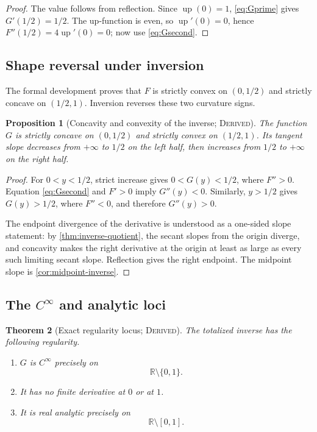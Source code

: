 \documentclass[11pt,oneside]{article}
\newtheorem{theorem}{Theorem}[section]
\newtheorem{proposition}[theorem]{Proposition}
\theoremstyle{definition}
\theoremstyle{remark}
\newcommand{\R}{\mathbb R}
\newcommand{\Up}{\operatorname{up}}
\newcommand{\InvF}{G}
\newcommand{\Derived}{\textsc{Derived}}
\begin{document}
\begin{proof}
The value follows from reflection.  Since $\Up(0)=1$,
\eqref{eq:Gprime} gives $\InvF'(1/2)=1/2$.  The up-function is even, so
$\Up'(0)=0$, hence $F''(1/2)=4\Up'(0)=0$; now use
\eqref{eq:Gsecond}.
\end{proof}

\subsection{Shape reversal under inversion}

The formal development proves that $F$ is strictly convex on
$(0,1/2)$ and strictly concave on $(1/2,1)$.  Inversion reverses these
two curvature signs.

\begin{proposition}[Concavity and convexity of the inverse; \Derived]
\label{prop:inverse-shape}
The function $\InvF$ is strictly concave on $(0,1/2)$ and strictly convex
on $(1/2,1)$.  Its tangent slope decreases from $+\infty$ to $1/2$ on the
left half, then increases from $1/2$ to $+\infty$ on the right half.
\end{proposition}

\begin{proof}
For $0<y<1/2$, strict increase gives $0<\InvF(y)<1/2$, where
$F''>0$.  Equation \eqref{eq:Gsecond} and $F'>0$ imply
$\InvF''(y)<0$.  Similarly, $y>1/2$ gives $\InvF(y)>1/2$, where
$F''<0$, and therefore $\InvF''(y)>0$.

The endpoint divergence of the derivative is understood as a one-sided
slope statement: by \cref{thm:inverse-quotient}, the secant slopes from
the origin diverge, and concavity makes the right derivative at the
origin at least as large as every such limiting secant slope.  Reflection
gives the right endpoint.  The midpoint slope is
\cref{cor:midpoint-inverse}.
\end{proof}

\subsection{\texorpdfstring{The \(C^\infty\) and analytic loci}{The smooth and analytic loci}}

\begin{theorem}[Exact regularity locus; \Derived]
\label{thm:inverse-regularity}
The totalized inverse has the following regularity.
\begin{enumerate}
\item $\InvF$ is $C^\infty$ precisely on
\[
 \R\setminus\{0,1\}.
\]
\item It has no finite derivative at $0$ or at $1$.
\item It is real analytic precisely on
\[
 \R\setminus[0,1].
\]
\end{enumerate}
\end{theorem}
\end{document}
